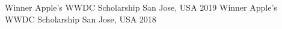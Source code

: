 \begin{cvhonors}
  \cvhonor
    {Winner}
    {Apple's WWDC Scholarship}
    {San Jose, USA}
    {2019}
  \cvhonor
    {Winner}
    {Apple's WWDC Scholarship}
    {San Jose, USA}
    {2018}
\end{cvhonors}
